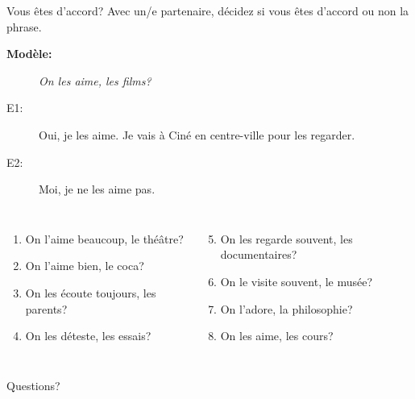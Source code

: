 \documentclass{beamer}
\begin{document}
  \begin{frame}{Vous êtes d'accord?}
    Avec un/e partenaire, décidez si vous êtes d'accord ou non la phrase.
    \begin{description}
      \item[\textbf{Modèle:}] \emph{On les aime, les films?}
      \item[E1:] Oui, je les aime. Je vais à Ciné en centre-ville pour les regarder.
      \item[E2:] Moi, je ne les aime pas.
    \end{description}
    \begin{columns}[t]
        \begin{enumerate}
          \item On l'aime beaucoup, le théâtre?
          \item On l'aime bien, le coca?
          \item On les écoute toujours, les parents?
          \item On les déteste, les essais?
        \end{enumerate}
        \begin{enumerate}
          \setcounter{enumi}{4}
          \item On les regarde souvent, les documentaires?
          \item On le visite souvent, le musée?
          \item On l'adore, la philosophie?
          \item On les aime, les cours?
        \end{enumerate}
    \end{columns}
  \end{frame}

  \begin{frame}{}
    \begin{center}
      \Large Questions?
    \end{center}
  \end{frame}
\end{document}

